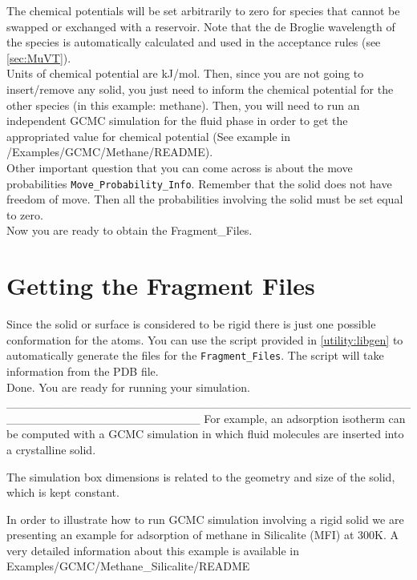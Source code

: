 The chemical potentials will be set arbitrarily to zero for species that cannot 
be swapped or exchanged with a reservoir. Note that the de Broglie wavelength of the 
species is automatically calculated and used in the acceptance rules (see \ref{sec:MuVT}). \\

Units of chemical potential are kJ/mol. Then, since you are not going to insert/remove any 
solid, you just need to inform the chemical potential for the other species 
(in this example: methane). Then, you will need to run an independent GCMC 
simulation for the fluid phase in order to get the appropriated value for chemical 
potential (See example in /Examples/GCMC/Methane/README). \\

Other important question that you can come across is about the move 
probabilities \texttt{Move\_Probability\_Info}. 
Remember that the solid does not have freedom of move. 
Then all the probabilities involving the solid must be set equal to zero. \\

Now you are ready to obtain the Fragment\_Files. \\

\section{Getting the Fragment Files}\label{sec:fragment file}
Since the solid or surface is considered to be rigid there is just one possible conformation 
for the atoms. You can use the script provided in \ref{utility:libgen} to
automatically generate the files for the \texttt{Fragment\_Files}.
The script will take information from the PDB file. \\


Done. You are ready for running your simulation.
_______________________________________________________________________
For example, an adsorption isotherm can be computed with a GCMC simulation in which fluid molecules
are inserted into a crystalline solid.

The simulation box dimensions is related to the geometry and size of the solid, which is kept constant. 

In  order to illustrate how to run GCMC simulation involving a rigid solid we are presenting an example 
for adsorption of methane in Silicalite (MFI) at 300K. 
A very detailed information about this example is available in Examples/GCMC/Methane\_Silicalite/README

